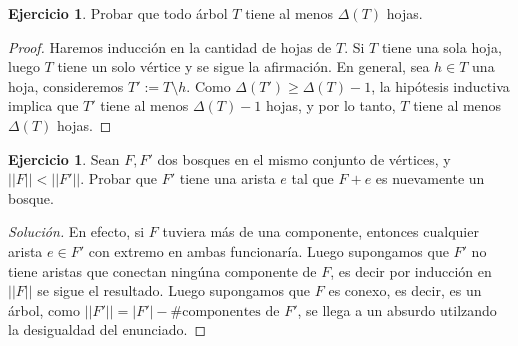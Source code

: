 \documentclass[12pt]{report}
\theoremstyle{plain}
\theoremstyle{definition}
\newtheorem{exercise}[theorem]{Ejercicio}
\newenvironment{solution}{\begin{proof}[Solución]}{\end{proof}}
\newcommand{\abs}[1]{\left \vert #1 \right \vert}
\newcommand{\Abs}[1]{\left \vert \left \vert #1 \right \vert \right \vert}
\begin{document}
\begin{exercise}
Probar que todo árbol $T$ tiene al menos $\Delta (T)$ hojas.
\end{exercise}
\begin{proof}
Haremos inducción en la cantidad de hojas de $T$. Si $T$ tiene una sola hoja, luego $T$ tiene un solo vértice y se sigue la afirmación. En general, sea $h \in T$ una hoja, consideremos $T' := T \setminus h$. Como $\Delta (T') \geq \Delta (T) - 1$, la hipótesis inductiva implica que $T'$ tiene al menos $\Delta (T) - 1$ hojas, y por lo tanto, $T$ tiene al menos $\Delta (T)$ hojas.
\end{proof}




\begin{exercise}
Sean $F,F'$ dos bosques en el mismo conjunto de vértices, y $\Abs F < \Abs  {F'}$. Probar que $F'$ tiene una arista $
e$ tal que $F + e$ es nuevamente un bosque.
\end{exercise}
\begin{solution}
En efecto, si $F$ tuviera más de una componente, entonces cualquier arista $e \in F'$ con extremo en ambas
funcionaría. Luego supongamos que $F'$ no tiene aristas que conectan ningúna componente de $F$, es decir por
inducción en $\Abs F$ se sigue el resultado. Luego supongamos que $F$ es conexo, es decir, es un árbol, como $\Abs {F'} = \abs {F'}- \# \text{componentes de $F'$}$, se llega a un absurdo utilzando la desigualdad del enunciado.
\end{solution}
\end{document}
